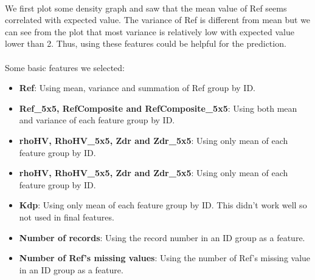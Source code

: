\documentclass{article} %
\begin{document}
\\
We first plot some density graph and saw that the mean value of Ref seems correlated with expected value. The variance of Ref is different from mean but we can see from the plot that most variance is relatively low with expected value lower than 2. Thus, using these features could be helpful for the prediction.\\
\\
Some basic features we selected:
\begin{itemize}
\item\textbf{Ref}: Using mean, variance and summation of Ref group by ID.
\item\textbf{Ref\_5x5, RefComposite and RefComposite\_5x5}: Using both mean and variance of each feature group by ID.
\item\textbf{rhoHV, RhoHV\_5x5, Zdr and Zdr\_5x5}: Using only mean of each feature group by ID.
\item\textbf{rhoHV, RhoHV\_5x5, Zdr and Zdr\_5x5}: Using only mean of each feature group by ID.
\item\textbf{Kdp}: Using only mean of each feature group by ID. This didn't work well so not used in final features.
\item\textbf{Number of records}: Using the record number in an ID group as a feature.
\item\textbf{Number of Ref's missing values}: Using the number of Ref's missing value in an ID group as a feature.
\end{itemize}
\end{document}
